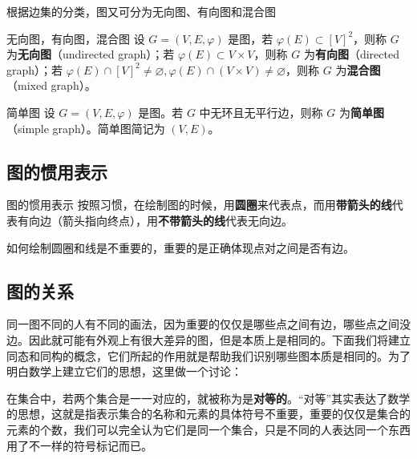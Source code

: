 根据边集的分类，图又可分为无向图、有向图和混合图
\begin{definition}{无向图，有向图，混合图}
设 $G=(V,E,\varphi)$ 是图，若 $\varphi(E)\subset[V]^2$，则称 $G$ 为\textbf{无向图}（undirected graph）；若 $\varphi(E)\subset V\times V$，则称 $G$ 为\textbf{有向图}（directed graph）；若 $\varphi(E)\cap[V]^2\neq\varnothing,\varphi(E)\cap (V\times V)\neq\varnothing$，则称 $G$ 为\textbf{混合图}（mixed graph）。
\end{definition}


\begin{definition}{简单图}
设 $G=(V,E,\varphi)$ 是图。若 $G$ 中无环且无平行边，则称 $G$ 为\textbf{简单图}（simple graph）。简单图简记为 $(V,E)$。
\end{definition}


\subsection{图的惯用表示}

\begin{definition}{图的惯用表示}
按照习惯，在绘制图的时候，用\textbf{圆圈}来代表点，而用\textbf{带箭头的线}代表有向边（箭头指向终点），用\textbf{不带箭头的线}代表无向边。
\end{definition}
如何绘制圆圈和线是不重要的，重要的是正确体现点对之间是否有边。
\subsection{图的关系}



同一图不同的人有不同的画法，因为重要的仅仅是哪些点之间有边，哪些点之间没边。因此就可能有外观上有很大差异的图，但是本质上是相同的。下面我们将建立同态和同构的概念，它们所起的作用就是帮助我们识别哪些图本质是相同的。为了明白数学上建立它们的思想，这里做一个讨论：

在集合中，若两个集合是一一对应的，就被称为是\textbf{对等的}。“对等”其实表达了数学的思想，这就是指表示集合的名称和元素的具体符号不重要，重要的仅仅是集合的元素的个数，我们可以完全认为它们是同一个集合，只是不同的人表达同一个东西用了不一样的符号标记而已。

